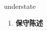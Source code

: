 
\begin{frame}
{\huge understate}
\begin{center}
\begin{enumerate}\Large
  \item \textbf{保守陈述}
\end{enumerate}
\end{center}
\end{frame}

